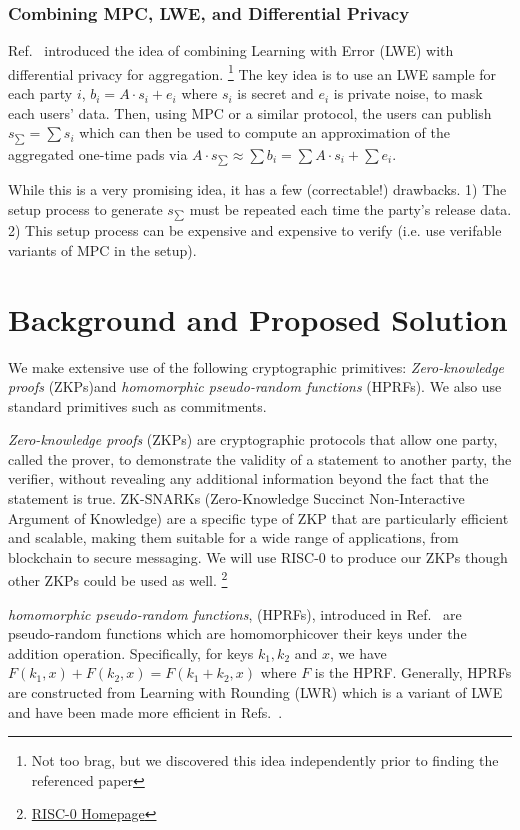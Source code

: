 \documentclass[11pt]{article}
\begin{document}
\subsubsection*{Combining MPC, LWE, and Differential Privacy}
Ref.~\cite{stevens2021efficientdifferentiallyprivatesecure} introduced the idea of combining Learning with Error (LWE) with differential privacy for aggregation.
\footnote{Not too brag, but we discovered this idea independently prior to finding the referenced paper}
The key idea is to use an LWE sample for each party $i$, $b_i = A \cdot s_i + e_i$ where $s_i$ is secret and $e_i$ is private noise, to mask each users' data.
Then, using MPC or a similar protocol, the users can publish $s_{\sum} = \sum s_i$ which can then be used to compute an approximation of the aggregated one-time pads via $A \cdot s_{\sum} \approx \sum b_i = \sum A \cdot s_i + \sum e_i$.

While this is a very promising idea, it has a few (correctable!) drawbacks.
1) The setup process to generate $s_{\sum}$ must be repeated each time the party's release data.
2) This setup process can be expensive and expensive to verify (i.e. use verifable variants of MPC in the setup).

\section{Background and Proposed Solution}
We make extensive use of the following cryptographic primitives: \emph{Zero-knowledge proofs} (ZKPs)and \emph{homomorphic pseudo-random functions} (HPRFs).
We also use standard primitives such as commitments.

\emph{Zero-knowledge proofs} (ZKPs) are cryptographic protocols that allow one party, called the prover, to demonstrate the validity of a statement to another party, the verifier, without revealing any additional information beyond the fact that the statement is true. 
ZK-SNARKs (Zero-Knowledge Succinct Non-Interactive Argument of Knowledge) are a specific type of ZKP that are particularly efficient and scalable, making them suitable for a wide range of applications, from blockchain to secure messaging.
We will use RISC-0 to produce our ZKPs though other ZKPs could be used as well.
\footnote{\href{https://risczero.com/}{RISC-0 Homepage}}

\emph{homomorphic pseudo-random functions}, (HPRFs), introduced in Ref.~\cite{boneh2013key} are pseudo-random functions which are homomorphicover their keys under the addition operation.
Specifically, for keys $k_1, k_2$ and $x$, we have $F(k_1, x) + F(k_2, x) = F(k_1 + k_2, x)$ where $F$ is the HPRF.
Generally, HPRFs are constructed from Learning with Rounding (LWR) which is a variant of LWE and have been made more efficient in Refs.~\cite{newKeyHom, kim2020key}.
\end{document}
